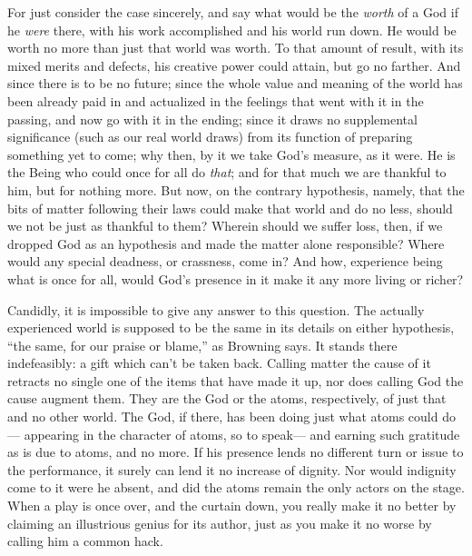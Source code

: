 \documentclass[]{article}
\begin{document}
For just consider the case sincerely, and say what would be the \emph{worth} of a God if he \emph{were} there, with his work accomplished and his world run down. He would be worth no more than just that world was worth. To that amount of result, with its mixed merits and defects, his creative power could attain, but go no farther. And since there is to be no future; since the whole value and meaning of the world has been already paid in and actualized in the feelings that went with it in the passing, and now go with it in the ending; since it draws no supplemental significance (such as our real world draws) from its function of preparing something yet to come; why then, by it we take God's measure, as it were. He is the Being who could once for all do \emph{that}; and for that much we are thankful to him, but for nothing more. But now, on the contrary hypothesis, namely, that the bits of matter following their laws could make that world and do no less, should we not be just as thankful to them? Wherein should we suffer loss, then, if we dropped God as an hypothesis and made the matter alone responsible? Where would any special deadness, or crassness, come in? And how, experience being what is once for all, would God's presence in it make it any more living or richer?

Candidly, it is impossible to give any answer to this question. The actually experienced world is supposed to be the same in its details on either hypothesis, ``the same, for our praise or blame,'' as Browning says. It stands there indefeasibly: a gift which can't be taken back. Calling matter the cause of it retracts no single one of the items that have made it up, nor does calling God the cause augment them. They are the God or the atoms, respectively, of just that and no other world. The God, if there, has been doing just what atoms could do--- appearing in the character of atoms, so to speak--- and earning such gratitude as is due to atoms, and no more. If his presence lends no different turn or issue to the performance, it surely can lend it no increase of dignity. Nor would indignity come to it were he absent, and did the atoms remain the only actors on the stage. When a play is once over, and the curtain down, you really make it no better by claiming an illustrious genius for its author, just as you make it no worse by calling him a common hack.
\end{document}
